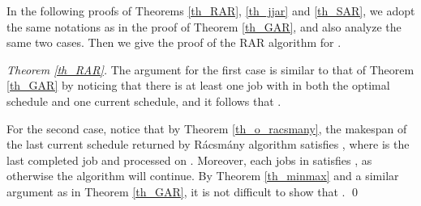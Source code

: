 \documentclass{llncs}
\numberwithin{subcase}{case}
\begin{document}
In the following proofs of Theorems \ref{th_RAR}, \ref{th_jjar} and \ref{th_SAR}, we adopt the same notations as in the proof of Theorem \ref{th_GAR}, and also analyze the same two cases. Then we give the proof of the RAR algorithm for .

\begin{proof}[Theorem \ref{th_RAR}]
The argument for the first case is similar to that of Theorem \ref{th_GAR} by noticing that there is at least one job with  in both the optimal schedule and one current schedule, and it follows that .

For the second case, notice that by Theorem \ref{th_o_racsmany}, the makespan of the last current schedule returned by R{\'a}csm{\'a}ny algorithm satisfies , where  is the last completed job and processed on . Moreover, each jobs in  satisfies , as otherwise the algorithm will continue. By Theorem \ref{th_minmax} and a similar argument as in Theorem \ref{th_GAR}, it is not difficult to show that .
\qed
\end{proof}
\end{document}
